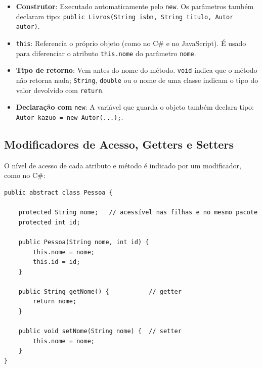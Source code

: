 \begin{itemize}
    \item \textbf{Construtor}: Executado automaticamente pelo \texttt{new}. Os parâmetros também
    declaram tipo: \texttt{public Livros(String isbn, String titulo, Autor autor)}.

    \item \texttt{this}: Referencia o próprio objeto (como no C\# e no JavaScript). É usado para
    diferenciar o atributo \texttt{this.nome} do parâmetro \texttt{nome}.

    \item \textbf{Tipo de retorno}: Vem antes do nome do método. \texttt{void} indica que o
    método não retorna nada; \texttt{String}, \texttt{double} ou o nome de uma classe indicam o
    tipo do valor devolvido com \texttt{return}.

    \item \textbf{Declaração com} \texttt{new}: A variável que guarda o objeto também declara
    tipo: \texttt{Autor kazuo = new Autor(...);}.
\end{itemize}

\subsection{Modificadores de Acesso, Getters e Setters}

O nível de acesso de cada atributo e método é indicado por um modificador, como no C\#:

\begin{lstlisting}[style=java]
public abstract class Pessoa {

    protected String nome;   // acessível nas filhas e no mesmo pacote
    protected int id;

    public Pessoa(String nome, int id) {
        this.nome = nome;
        this.id = id;
    }

    public String getNome() {           // getter
        return nome;
    }

    public void setNome(String nome) {  // setter
        this.nome = nome;
    }
}
\end{lstlisting}

